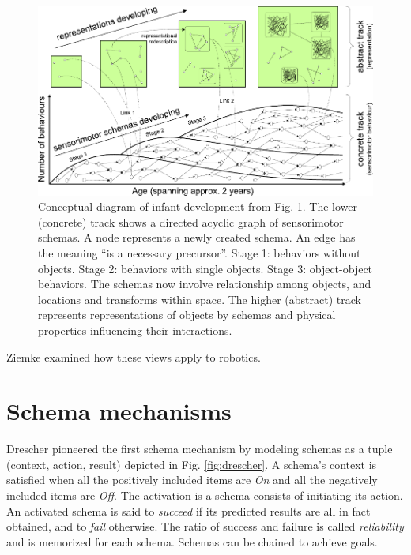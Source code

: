 \documentclass[runningheads]{llncs}
\begin{document}
\begin{figure}
	\includegraphics[width=\textwidth]{Figure_1_guerin.pdf}
	\caption{Conceptual diagram of infant development from \cite{guerin_survey_2013} Fig. 1.
	The lower (concrete) track shows a directed acyclic graph of sensorimotor schemas. 
	A node represents a newly created schema. 
	An edge has the meaning ``is a necessary precursor''. 
    Stage 1: behaviors without objects. 
    Stage 2: behaviors with single objects. 
    Stage 3: object-object behaviors. The schemas now involve relationship among objects, and locations and transforms within space.
    The higher (abstract) track represents representations of objects by schemas and physical properties influencing their interactions.} 
	\label{fig:general}
\end{figure}

Ziemke \cite{ziemke_construction_2001} examined how these views apply to robotics.


\section{Schema mechanisms}

Drescher \cite{drescher_made-up_1991} pioneered the first schema mechanism by modeling schemas as a tuple (context, action, result) depicted in Fig. \ref{fig:drescher}. 
A schema's context is satisfied when all the positively included items are \textit{On} and all the negatively included items are \textit{Off}. 
The activation is a schema consists of initiating its action. An activated schema is said to \textit{succeed} if its predicted results are all in fact obtained, and to \textit{fail} otherwise. The ratio of success and failure is called \textit{reliability} and is memorized for each schema.  
Schemas can be chained to achieve goals. 
\end{document}
